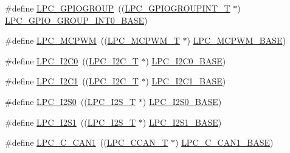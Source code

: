 \begin{DoxyCompactItemize}
\item 
\#define \hyperlink{group___p_e_r_i_p_h__18_x_x___b_a_s_e_gab6060ccc34c97651f9f8baf8f75a98ea}{L\+P\+C\+\_\+\+G\+P\+I\+O\+G\+R\+O\+UP}~((\hyperlink{struct_l_p_c___g_p_i_o_g_r_o_u_p_i_n_t___t}{L\+P\+C\+\_\+\+G\+P\+I\+O\+G\+R\+O\+U\+P\+I\+N\+T\+\_\+T}     $\ast$) \hyperlink{group___p_e_r_i_p_h__43_x_x___b_a_s_e_ga4bb8560e4125ff2b4dca337887316977}{L\+P\+C\+\_\+\+G\+P\+I\+O\+\_\+\+G\+R\+O\+U\+P\+\_\+\+I\+N\+T0\+\_\+\+B\+A\+SE})
\item 
\#define \hyperlink{group___p_e_r_i_p_h__18_x_x___b_a_s_e_ga6fe8e415821195a786b3f0dc5e7fc9fa}{L\+P\+C\+\_\+\+M\+C\+P\+WM}~((\hyperlink{struct_l_p_c___m_c_p_w_m___t}{L\+P\+C\+\_\+\+M\+C\+P\+W\+M\+\_\+T}            $\ast$) \hyperlink{group___p_e_r_i_p_h__43_x_x___b_a_s_e_gad8a41dc802e3ea0ba9457d42a6927c03}{L\+P\+C\+\_\+\+M\+C\+P\+W\+M\+\_\+\+B\+A\+SE})
\item 
\#define \hyperlink{group___p_e_r_i_p_h__18_x_x___b_a_s_e_ga14b6c56857e970a682a9bb22a0cb6716}{L\+P\+C\+\_\+\+I2\+C0}~((\hyperlink{struct_l_p_c___i2_c___t}{L\+P\+C\+\_\+\+I2\+C\+\_\+T}              $\ast$) \hyperlink{group___p_e_r_i_p_h__43_x_x___b_a_s_e_gab4476c9e874621194369f74fcf26ce92}{L\+P\+C\+\_\+\+I2\+C0\+\_\+\+B\+A\+SE})
\item 
\#define \hyperlink{group___p_e_r_i_p_h__18_x_x___b_a_s_e_gad6d6333e47875813be171cffef258837}{L\+P\+C\+\_\+\+I2\+C1}~((\hyperlink{struct_l_p_c___i2_c___t}{L\+P\+C\+\_\+\+I2\+C\+\_\+T}              $\ast$) \hyperlink{group___p_e_r_i_p_h__43_x_x___b_a_s_e_gae59f73cf24ff126be3b9a8b921926676}{L\+P\+C\+\_\+\+I2\+C1\+\_\+\+B\+A\+SE})
\item 
\#define \hyperlink{group___p_e_r_i_p_h__18_x_x___b_a_s_e_ga4887dae88a015542b54639daf8ec5f61}{L\+P\+C\+\_\+\+I2\+S0}~((\hyperlink{struct_l_p_c___i2_s___t}{L\+P\+C\+\_\+\+I2\+S\+\_\+T}              $\ast$) \hyperlink{group___p_e_r_i_p_h__43_x_x___b_a_s_e_gae77fe89f0abd4b4b73de7ab5adc822f5}{L\+P\+C\+\_\+\+I2\+S0\+\_\+\+B\+A\+SE})
\item 
\#define \hyperlink{group___p_e_r_i_p_h__18_x_x___b_a_s_e_ga9bb3d01c98234fe6e7d12d171fe283b2}{L\+P\+C\+\_\+\+I2\+S1}~((\hyperlink{struct_l_p_c___i2_s___t}{L\+P\+C\+\_\+\+I2\+S\+\_\+T}              $\ast$) \hyperlink{group___p_e_r_i_p_h__43_x_x___b_a_s_e_gad2702d06c20bbf06f072e29ec173e4ab}{L\+P\+C\+\_\+\+I2\+S1\+\_\+\+B\+A\+SE})
\item 
\#define \hyperlink{group___p_e_r_i_p_h__18_x_x___b_a_s_e_gaf34264b6322506295cc7b7e1ac903148}{L\+P\+C\+\_\+\+C\+\_\+\+C\+A\+N1}~((\hyperlink{struct_l_p_c___c_c_a_n___t}{L\+P\+C\+\_\+\+C\+C\+A\+N\+\_\+T}             $\ast$) \hyperlink{group___p_e_r_i_p_h__43_x_x___b_a_s_e_ga4715c87f8d58d962b5fa3d4e23e06328}{L\+P\+C\+\_\+\+C\+\_\+\+C\+A\+N1\+\_\+\+B\+A\+SE})

\end{DoxyCompactItemize}
